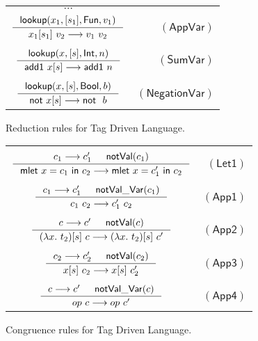 \documentclass[preprint,authoryear,sort&compress,9pt,nocopyrightspace]{article}
\newcommand\rulename[1]{\mathsf{(#1)}}
\newcommand{\tto}{\longrightarrow}
\newcommand{\conf}[2][s]{(#2)[#1]}
\newcommand{\oletP}[3]{\mathsf{mlet} \ x = #2 \ \mathsf{in}  \ #3}
\newcommand{\absST}[2]{\lambda #1. \ #2}
\newcommand{\negacion}[1]{\mathsf{not} \ #1}
\newcommand{\suma}[1]{\mathsf{add1} \ #1}
\newcommand{\boolt}{\mathsf{Bool}}
\newcommand{\intt}{\mathsf{Int}}
\newcommand{\funt}{\mathsf{Fun}}
\newcommand{\novalvar}[1]{\mathsf{notVal\_Var}(#1)}
\newcommand{\noval}[1]{\mathsf{notVal}(#1)}
\newcommand{\buscar}{\mathsf{lookup}}
\newcommand{\semanticB}{Tag Driven Language}
\begin{document}
\begin{figure}[h]
\begin{small}
\begin{center}
\begin{tabular}{|c r|}
\hline
$\cdots$&\\
$\inference{ \buscar(x_1, [s_1],\funt, v_1)}{x_1[s_1] \ v_2 \tto v_1 \ v_2}$&$\rulename{AppVar}$\\
&\\
$\inference{\buscar(x, [s], \intt, n)}{\suma{x[s]} \tto \suma{n}}$&$\rulename{SumVar}$\\
&\\
$\inference{\buscar(x, [s], \boolt, b)}{\negacion{x[s]} \tto \negacion \ b}$&$\rulename{NegationVar}$\\
\hline
\end{tabular}
\caption{Reduction rules for \semanticB.}
\label{tabla:reductionRules2}
\end{center}
\end{small}
\end{figure}

\begin{figure}[h]
\begin{small}
\begin{center}
\begin{tabular}{|c r|}
\hline
&\\
$ \inference {c_1 \tto c_1' & \noval{c_1}}{\oletP{T_1}{c_1}{c_2} \tto \oletP{T_1}{c_1'}{c_2} }$&$\rulename{Let1} $\\
&\\
$\inference {c_1 \tto c_1' & \novalvar{c_1}}{c_1 \ c_2 \tto c_1' \ c_2} $&$\rulename{App1}  $\\
&\\
$ \inference {c \tto c' & \noval{c}}{\conf{\absST{x}{t_2}} \ c \tto \conf{\absST{x}{t_2}} \ c'}$&$\rulename{App2}  $\\
&\\
$ \inference {c_2 \tto c_2' & \noval{c_2}}{x[s] \ c_2 \tto x[s] \ c_2'}$&$\rulename{App3}  $\\
&\\
$ \inference {c \tto c' & \novalvar{c}}{op \ c \tto op \ c'}$&$\rulename{App4}  $\\
\hline
\end{tabular}
\caption{Congruence rules for \semanticB.}
\label{tabla:congruenceRules2}
\end{center}
\end{small}
\end{figure}
\end{document}
